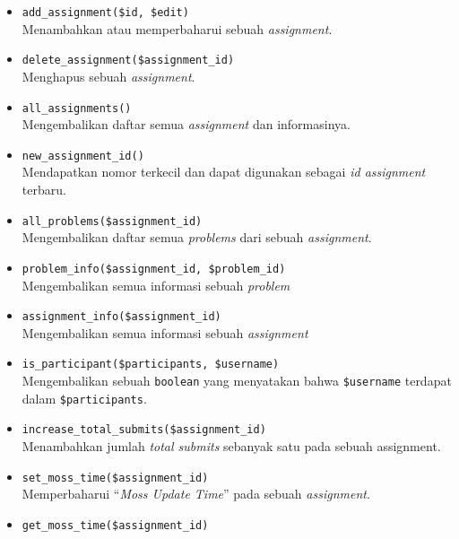 \documentclass[a4paper,twoside]{article}
\begin{document}
\begin{enumerate}
\begin{itemize}
\begin{itemize}
			                  \begin{itemize}
				                  \item \verb|add_assignment($id, $edit)| \\
				                        Menambahkan atau memperbaharui sebuah \textit{assignment}.
				                  \item \verb|delete_assignment($assignment_id)| \\
				                        Menghapus sebuah \textit{assignment}.
				                  \item \verb|all_assignments()| \\
				                        Mengembalikan daftar semua \textit{assignment} dan informasinya.
				                  \item \verb|new_assignment_id()| \\
				                        Mendapatkan nomor terkecil dan dapat digunakan sebagai \textit{id assignment} terbaru.
				                  \item \verb|all_problems($assignment_id)| \\
				                        Mengembalikan daftar semua \textit{problems} dari sebuah \textit{assignment}.
				                  \item \verb|problem_info($assignment_id, $problem_id)| \\
				                        Mengembalikan semua informasi sebuah \textit{problem}
				                  \item \verb|assignment_info($assignment_id)| \\
				                        Mengembalikan semua informasi sebuah \textit{assignment}
				                  \item \verb|is_participant($participants, $username)| \\
				                        Mengembalikan sebuah \verb|boolean| yang menyatakan bahwa \verb|$username| terdapat dalam \verb|$participants|.
				                  \item \verb|increase_total_submits($assignment_id)| \\
				                        Menambahkan jumlah \textit{total submits} sebanyak satu pada sebuah assignment.
				                  \item \verb|set_moss_time($assignment_id)| \\
				                        Memperbaharui ``\textit{Moss Update Time}'' pada sebuah \textit{assignment}.
				                  \item \verb|get_moss_time($assignment_id)| \\

\end{itemize}
\end{itemize}
\end{itemize}
\end{enumerate}
\end{document}
